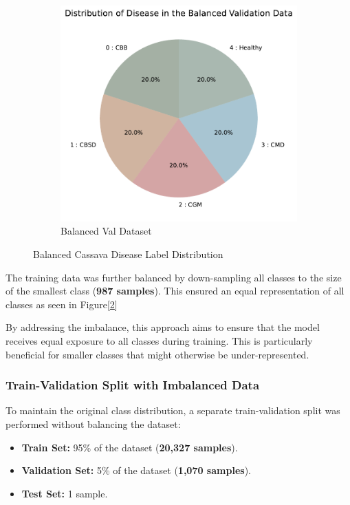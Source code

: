 \begin{figure}[t]
\begin{subfigure}{0.4\textwidth}
        \includegraphics[width=\linewidth]{graphs/overview/Distribution of Disease in the Balanced Validation Data.pdf}
        \caption{Balanced Val Dataset}
        \label{fig:BalancedVal}
    \end{subfigure}
    \caption{Balanced Cassava Disease Label Distribution}
    \label{fig:BalancedDataset}
\end{figure} 

The training data was further balanced by down-sampling all classes to the size of the smallest class (\textbf{987 samples}). This ensured an equal representation of all classes as seen in Figure[\ref{fig:BalancedDataset}]

By addressing the imbalance, this approach aims to ensure that the model receives equal exposure to all classes during training. This is particularly beneficial for smaller classes that might otherwise be under-represented.

\subsubsection{Train-Validation Split with Imbalanced Data}
To maintain the original class distribution, a separate train-validation split was performed without balancing the dataset:

\begin{itemize}
    \item \textbf{Train Set:} 95\% of the dataset (\textbf{20,327 samples}).
    \item \textbf{Validation Set:} 5\% of the dataset (\textbf{1,070 samples}).
    \item \textbf{Test Set:} 1 sample.
\end{itemize}


